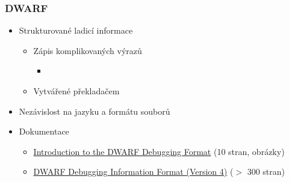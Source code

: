 
\begin{frame}
  \frametitle{DWARF}

  \begin{itemize}
    \item Strukturované ladicí informace
    \begin{itemize}
      \item Zápis komplikovaných výrazů
      \begin{itemize}
	\item {}
      \end{itemize}

      \pause

      \item Vytvářené překladačem
    \end{itemize}

    \item Nezávislost na jazyku a formátu souborů

    \pause

    \item Dokumentace
    \begin{itemize}
      \item \href{http://www.dwarfstd.org/doc/Debugging\%20using\%20DWARF.pdf}{Introduction to the DWARF Debugging Format} (10 stran, obrázky)
      \item \href{http://www.dwarfstd.org/doc/DWARF4.pdf}{DWARF Debugging Information Format (Version 4)} ($>$ 300 stran)
    \end{itemize}

  \end{itemize}

\end{frame}


